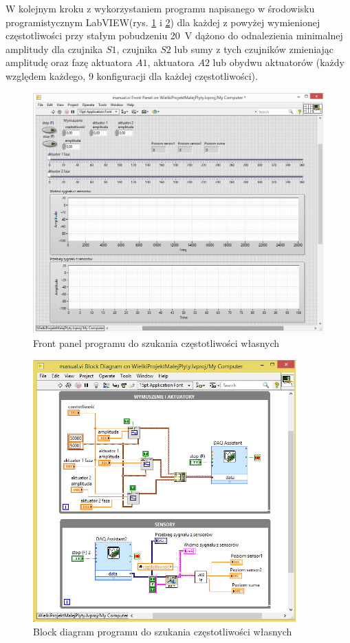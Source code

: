 \documentclass[polish,a4paper,11pt]{mwart}
\begin{document}
W kolejnym kroku z wykorzystaniem programu napisanego w środowisku
programistycznym LabVIEW\texttrademark (rys. \ref{fig:red_front} i
\ref{fig:red_block}) dla każdej z powyżej wymienionej częstotliwości przy
stałym pobudzeniu \SI{20}{\volt} dążono do odnalezienia minimalnej amplitudy
dla czujnika $S1$, czujnika $S2$ lub sumy z tych czujników zmieniając amplitudę
oraz fazę
aktuatora $A1$, aktuatora $A2$ lub obydwu aktuatorów (każdy względem każdego, 9
konfiguracji dla każdej częstotliwości).

\begin{figure}[!tbh]
  \centering
  \includegraphics[width=\textwidth]{bitgraphics/panel_front_red.png}
  \caption{Front panel programu do szukania częstotliwości własnych}
  \label{fig:red_front}
\end{figure}

\begin{figure}[!tbh]
  \centering
  \includegraphics[width=0.9\textwidth]{bitgraphics/panel_back_red.png}
  \caption{Block diagram programu do szukania częstotliwości własnych}
  \label{fig:red_block}
\end{figure}
\end{document}
